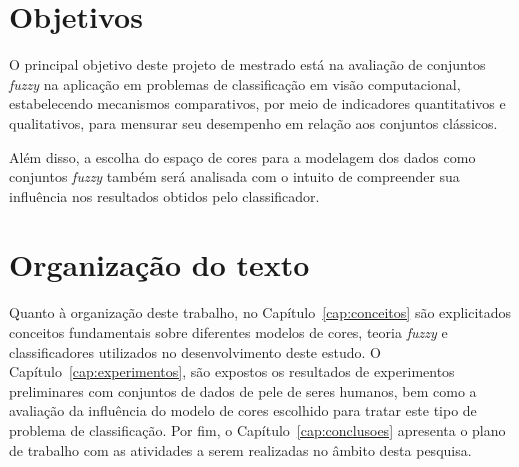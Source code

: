 \section{Objetivos}
\label{sec:objetivo}

O principal objetivo deste projeto de mestrado está na avaliação de conjuntos \emph{fuzzy} na aplicação em problemas de classificação em visão computacional, estabelecendo mecanismos comparativos, por meio de indicadores quantitativos e qualitativos, para mensurar seu desempenho em relação aos conjuntos clássicos.

Além disso, a escolha do espaço de cores para a modelagem dos dados como conjuntos \emph{fuzzy} também será analisada com o intuito de compreender sua influência nos resultados obtidos pelo classificador.


\section{Organização do texto}
\label{sec:organizacao_trabalho}

Quanto à organização deste trabalho, no Capítulo~\ref{cap:conceitos} são explicitados conceitos fundamentais sobre diferentes modelos de cores, teoria \emph{fuzzy} e classificadores utilizados no desenvolvimento deste estudo. O Capítulo~\ref{cap:experimentos}, são expostos os resultados de experimentos preliminares com conjuntos de dados de pele de seres humanos, bem como a avaliação da influência do modelo de cores escolhido para tratar este tipo de problema de classificação. Por fim, o Capítulo~\ref{cap:conclusoes} apresenta o plano de trabalho com as atividades a serem realizadas no âmbito desta pesquisa.
